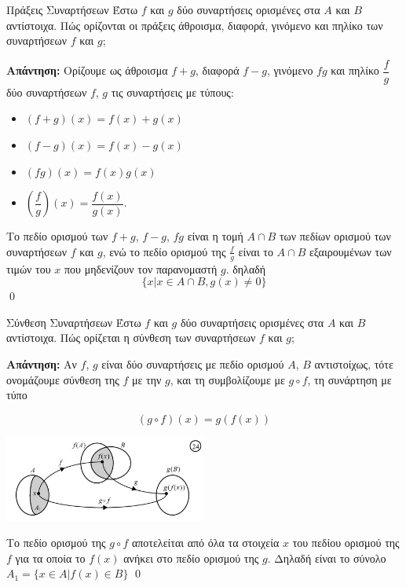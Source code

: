\documentclass[a4paper, 12pt]{article}
\renewenvironment{proof}[1][\textbf{Απάντηση}]{%
  \par\noindent\textbf{#1:} \rmfamily}{\qed\par}
\begin{document}
\begin{theorem}{Πράξεις Συναρτήσεων}
  Έστω $f$ και $g$ δύο συναρτήσεις ορισμένες στα $Α$ και $Β$ αντίστοιχα. Πώς ορίζονται οι πράξεις άθροισμα, διαφορά, γινόμενο και πηλίκο των συναρτήσεων $f$ και $g$;
\end{theorem}
\begin{proof}
  Ορίζουμε ως άθροισμα $f + g$,  διαφορά $f - g$,  γινόμενο $fg$  και  πηλίκο $\dfrac{f}{g}$ δύο συναρτήσεων $f$, $g$ τις συναρτήσεις με τύπους:
  \begin{itemize}
    \item $(f + g)(x) = f(x) + g(x)$
    \item $(f - g)(x) = f(x) - g(x)$
    \item $(fg)(x) = f(x)g(x)$
    \item $\left(\dfrac{f}{g}\right)(x) = \dfrac{f(x)}{g(x)}$.
  \end{itemize}
  Το πεδίο ορισμού των $f+g$, $f-g$, $fg$ είναι η τομή $A \cap B$ των πεδίων ορισμού των συναρτήσεων $f$ και $g$, ενώ το πεδίο ορισμού της $\frac{f}{g}$ είναι το $A \cap B$ εξαιρουμένων των τιμών του $x$ που μηδενίζουν τον παρανομαστή $g$. δηλαδή
  $$ \{ x|x\in A \cap B, g(x) \neq 0 \}$$
\end{proof}

\begin{theorem}{Σύνθεση Συναρτήσεων}
  Έστω $f$ και $g$ δύο συναρτήσεις ορισμένες στα $A$ και $B$ αντίστοιχα. Πώς ορίζεται η σύνθεση των συναρτήσεων $f$ και $g$;
\end{theorem}
\begin{proof}
  Αν $f$, $g$ είναι δύο συναρτήσεις με πεδίο ορισμού $Α$, $Β$ αντιστοίχως, τότε ονομάζουμε σύνθεση της $f$ με την $g$, και τη συμβολίζουμε με $g\circ f$, τη συνάρτηση με τύπο

  $$(g\circ f)(x) = g(f(x))$$


  \begin{center}
    \includegraphics[width=0.5\textwidth]{images/1.2 Σύνθεση}
  \end{center}

  Το πεδίο ορισμού της $g\circ f$ αποτελείται από όλα τα στοιχεία $x$ του πεδίου ορισμού της $f$ για τα οποία το $f(x)$ ανήκει στο πεδίο ορισμού της $g$. Δηλαδή είναι το σύνολο
  $A_1 = \{ x \in A   |   f(x) \in Β\}$
\end{proof}
\end{document}
